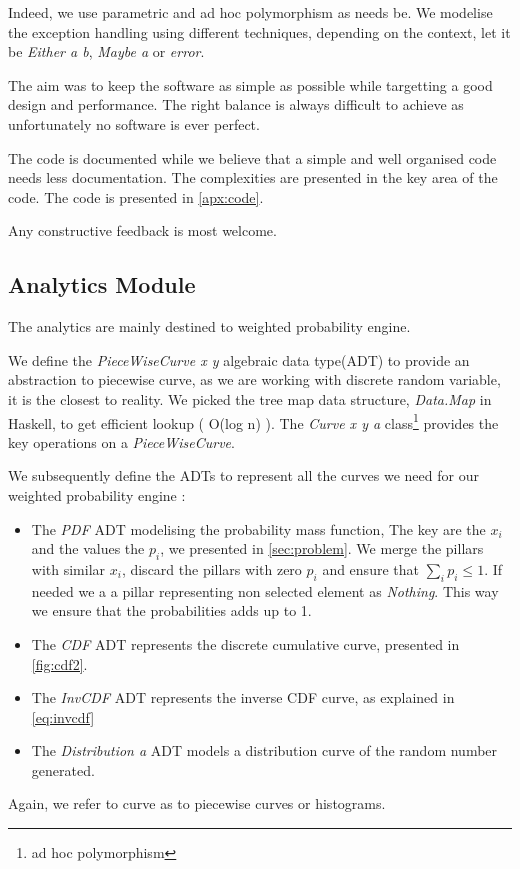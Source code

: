 \documentclass[12pt,a4paper,article]{memoir} %
\begin{document}
Indeed, we use parametric and ad hoc polymorphism as needs be.
We modelise the exception handling using different techniques, depending on
the context, let it be \emph{Either a b}, \emph{Maybe a} or \emph{error}. 

The aim was to keep the software as simple as possible while targetting a
good design and performance. 
The right balance is always difficult to achieve as unfortunately no 
software is ever perfect.

The code is documented while we believe that a simple and well organised
code needs less documentation. The complexities are presented in the key
area of the code. The code is presented in \autoref{apx:code}.

Any constructive feedback is most welcome.

\subsection{Analytics Module}

The analytics are mainly destined to weighted probability engine.

We define the \emph{PieceWiseCurve x y} algebraic data type(ADT) to provide an
abstraction to piecewise curve, as we are working with discrete
random variable, it is the closest to reality. We picked the tree map data
structure, \emph{Data.Map} in Haskell, to get efficient lookup ( O(log n) ).
The \emph{Curve x y a} class\footnote{ad hoc polymorphism} 
provides the key operations on a 
\emph{PieceWiseCurve}.  

We subsequently define the ADTs to represent all the curves we need
for our weighted probability engine :
\begin{itemize}
	\item The \emph{PDF} ADT modelising the probability mass function,
	The key are the $x_i$ and the values the $p_i$, we presented in
	\autoref{sec:problem}.
	We merge the pillars with similar $x_i$, discard the pillars with zero
	$p_i$ and ensure that $\sum_i p_i \leq 1$.
	If needed we a a pillar representing non selected element 
	as \emph{Nothing}. This way we ensure that the probabilities
	adds up to 1.
	\item The \emph{CDF} ADT represents the discrete cumulative
	curve, presented in \autoref{fig:cdf2}.
	\item The \emph{InvCDF} ADT represents the inverse CDF curve,
	as explained in \autoref{eq:invcdf}
	\item The \emph{Distribution a} ADT models a distribution curve
	of the random number generated.
\end{itemize}
Again, we refer to curve as to piecewise curves or histograms.
\end{document}
